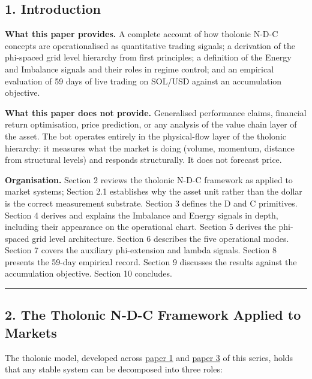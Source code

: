 \documentclass[
  11pt,
  letterpaper,
]{article}
\begin{document}
\subsection{1. Introduction}\label{introduction}

\textbf{What this paper provides.} A complete account of how tholonic
N-D-C concepts are operationalised as quantitative trading signals; a
derivation of the phi-spaced grid level hierarchy from first principles;
a definition of the Energy and Imbalance signals and their roles in
regime control; and an empirical evaluation of 59 days of live trading
on SOL/USD against an accumulation objective.

\textbf{What this paper does not provide.} Generalised performance
claims, financial return optimisation, price prediction, or any analysis
of the value chain layer of the asset. The bot operates entirely in the
physical-flow layer of the tholonic hierarchy: it measures what the
market is doing (volume, momentum, distance from structural levels) and
responds structurally. It does not forecast price.

\textbf{Organisation.} Section 2 reviews the tholonic N-D-C framework as
applied to market systems; Section 2.1 establishes why the asset unit
rather than the dollar is the correct measurement substrate. Section 3
defines the D and C primitives. Section 4 derives and explains the
Imbalance and Energy signals in depth, including their appearance on the
operational chart. Section 5 derives the phi-spaced grid level
architecture. Section 6 describes the five operational modes. Section 7
covers the auxiliary phi-extension and lambda signals. Section 8
presents the 59-day empirical record. Section 9 discusses the results
against the accumulation objective. Section 10 concludes.

\begin{center}\rule{0.5\linewidth}{0.5pt}\end{center}

\subsection{2. The Tholonic N-D-C Framework Applied to
Markets}\label{the-tholonic-n-d-c-framework-applied-to-markets}

The tholonic model, developed across
\href{https://github.com/baardev/truevalue/blob/main/docnav/Research/papers/1_recursive-tholonic-five-constants/1_recursive-tholonic-five-constants.pdf}{paper
1} and
\href{https://github.com/baardev/truevalue/blob/main/docnav/Research/papers/3_minimal-recursive-triadic-framework/3_minimal-recursive-triadic-framework.pdf}{paper
3} of this series, holds that any stable system can be decomposed into
three roles:
\end{document}
